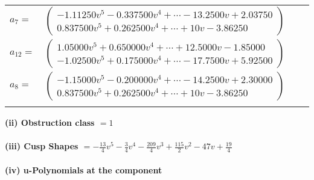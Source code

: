\documentclass[1p]{elsarticle_modified}
\theoremstyle{definition}
\begin{document}
\begin{tabular}{m{7pt} m{180pt} m{7pt} m{180pt} }
\flushright $a_{7}=$&$\begin{pmatrix}-1.11250 v^{5}-0.337500 v^{4}+\cdots-13.2500 v+2.03750\\0.837500 v^{5}+0.262500 v^{4}+\cdots+10 v-3.86250\end{pmatrix}$ \\
\flushright $a_{12}=$&$\begin{pmatrix}1.05000 v^{5}+0.650000 v^{4}+\cdots+12.5000 v-1.85000\\-1.02500 v^{5}+0.175000 v^{4}+\cdots-17.7500 v+5.92500\end{pmatrix}$ \\
\flushright $a_{8}=$&$\begin{pmatrix}-1.15000 v^{5}-0.200000 v^{4}+\cdots-14.2500 v+2.30000\\0.837500 v^{5}+0.262500 v^{4}+\cdots+10 v-3.86250\end{pmatrix}$\\&\end{tabular}
\flushleft \textbf{(ii) Obstruction class $= 1$}\\~\\
\flushleft \textbf{(iii) Cusp Shapes $= -\frac{13}{4} v^5-\frac{3}{4} v^4-\frac{209}{4} v^3+\frac{115}{2} v^2-47 v+\frac{19}{4}$}\\~\\
\newpage\renewcommand{\arraystretch}{1}
\flushleft \textbf{(iv) u-Polynomials at the component}\newline \\
\end{document}
